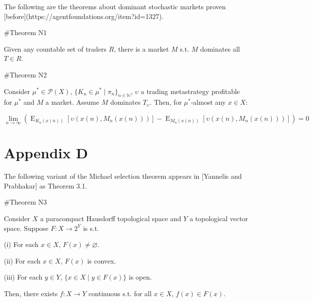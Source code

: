 \documentclass[a4paper]{article}
\newcommand{\Comment}[1]{}
\DeclareMathOperator{\E}{E}
\newcommand{\Nats}{\mathbb{N}}
\newcommand{\Prob}{\mathcal{P}}
\begin{document}
The following are the theorems about dominant stochastic markets proven [before](https://agentfoundations.org/item?id=1327).

\#Theorem N1

Given any countable set of traders $R$, there is a market ${M}$ s.t. ${M}$ dominates all ${T \in R}$.

\#Theorem N2

Consider ${\mu^* \in \Prob(X)}$, ${\{K_n \in \mu^* \mid \pi_{n}\}_{n \in \Nats}}$, ${\upsilon}$ a trading metastrategy profitable for ${\mu^*}$ and ${M}$ a market. Assume ${M}$ dominates ${T_\upsilon}$. Then, for ${\mu^*}$-almost any ${x \in X}$:

$$\lim_{n \rightarrow \infty} (\E_{K_n(x(n))}[\upsilon(x(n),M_n(x(n)))]-\E_{M_n(x(n))}[\upsilon(x(n),M_n(x(n)))])= 0$$

\section{Appendix D}

The following variant of the Michael selection theorem appears in [Yannelis and Prabhakar]\Comment{(https://www.biz.uiowa.edu/faculty/nyannelis/publications/Existence_of_Maximal_Elements_and_Equilibria_in_Linear_Topological_Spaces.pdf)} as Theorem 3.1.

\#Theorem N3

Consider $X$ a paracompact Hausdorff topological space and $Y$ a topological vector space. Suppose $F: X \rightarrow 2^Y$ is s.t.

(i) For each $x \in X$, $F(x) \ne \varnothing$.

(ii) For each $x \in X$, $F(x)$ is convex.

(iii) For each $y \in Y$, $\{x \in X \mid y \in F(x)\}$ is open.

Then, there exists $f: X \rightarrow Y$ continuous s.t. for all $x \in X$, $f(x) \in F(x)$.
\end{document}
